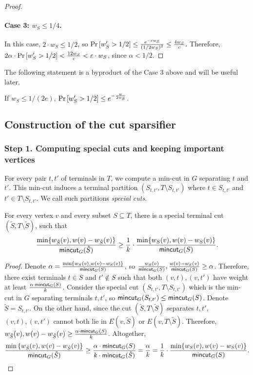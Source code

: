 \begin{proof}
	\paragraph{Case 3: $w_S \le 1/4$.} In this case, $2\cdot w_S \le 1/2$, so $\mathrm{Pr}\left[ w'_S > 1/2 \right] \le \frac{e^{-c w_S}}{(1/2w_S)^2} \le \frac{4w_S}{c}$. Therefore, $2\alpha \cdot \mathrm{Pr}\left[ w'_S > 1/2 \right] < \frac{12 w_S}{c} < {\varepsilon}\cdot w_S$, since $\alpha < 1/2$.
\end{proof}

The following statement is a byproduct of the Case 3 above and will be useful later.
%
\begin{claim} \label{prop:v2}
	If $w_S \le 1/(2e)$, $\mathrm{Pr}\left[ w'_S > 1/2 \right] \le e^{-\frac{w}{2w_S}}$.
\end{claim}

\subsection{Construction of the cut sparsifier}

\subsubsection*{Step 1. Computing special cuts and keeping important vertices}

For every pair $t,t'$ of terminals in $T$, we compute a min-cut in $G$ separating $t$ and $t'$. This min-cut induces a terminal partition $(S_{t,t'},T\setminus S_{t,t'})$ where $t\in S_{t,t'}$ and $t'\in T\setminus S_{t,t'}$. We call such partitions \emph{special cuts}.

\begin{claim} \label{lem:contribution}
For every vertex $v$ and every subset $S\subseteq T$, there is a special terminal cut $(\tilde S,T\setminus \tilde S)$, such that 
$$\frac{\min \{w_{\tilde S}(v),w(v)-w_{\tilde S}(v)\}}{\mathsf{mincut}_G(\tilde S)} \ge \frac{1}{k}\cdot \frac{\min \{w_S(v),w(v)-w_S(v)\}}{\mathsf{mincut}_G(S)}.$$
\end{claim}

\begin{proof}
Denote $\alpha=\frac{\min \{w_{S}(v),w(v)-w_{S}(v)\}}{\mathsf{mincut}_G(S)}$, so $\frac{w_S(v)}{\mathsf{mincut}_G(S)},\frac{w(v)-w_S(v)}{\mathsf{mincut}_G(S)}\ge \alpha$. Therefore, there exist terminals $t\in S$ and $t' \notin S$ such that both $(v,t),(v,t')$ have weight at least $\frac{\alpha \cdot \mathsf{mincut}_G(S)}{k}$. Consider the special cut $(S_{t,t'},T\setminus S_{t,t'})$ which is the min-cut in $G$ separating terminals $t,t'$, so $\mathsf{mincut}_G(S_{t,t'})\le \mathsf{mincut}_G(S)$.
Denote $\tilde S=S_{t,t'}$.
On the other hand, since the cut $(\tilde S,T\setminus \tilde S)$ separates $t,t'$, $(v,t),(v,t')$ cannot both lie in $E(v,\tilde S)$ or $E(v,T\setminus \tilde S)$. Therefore, $w_{\tilde S}(v),w(v)-w_{\tilde S}(v)\ge \frac{\alpha \cdot \mathsf{mincut}_G(S)}{k}$.
Altogether,
\[\frac{\min\left\{ w_{\tilde S}(v),w(v)-w_{\tilde S}(v) \right\}}{\mathsf{mincut}_G(\tilde S)}\ge \frac{\alpha \cdot \mathsf{mincut}_G(S)}{k\cdot \mathsf{mincut}_G(\tilde S)}=\frac{\alpha}{k}=\frac{1}{k}\cdot \frac{\min \{w_S(v),w(v)-w_S(v)\}}{\mathsf{mincut}_G(S)}.\]
\end{proof}

